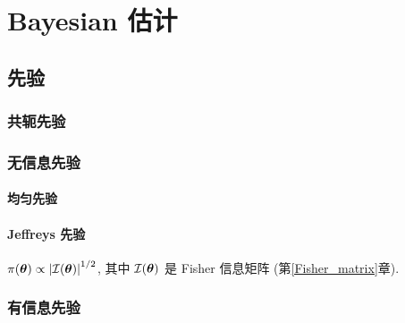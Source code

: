 \chapter{Bayesian 估计}

\section{先验}

\subsection{共轭先验}

\subsection{无信息先验}

\subsubsection{均匀先验}

\subsubsection{Jeffreys 先验}

$\pi(\boldsymbol{\theta})\propto\left\lvert \mathcal{I}(\boldsymbol{\theta})\right\rvert ^{1/2}$, 其中 $\mathcal{I}(\boldsymbol{\theta})$ 是 Fisher 信息矩阵 (第\ref{Fisher_matrix}章).

\subsection{有信息先验}
